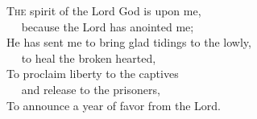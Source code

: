 
\lettrine{T}{he} spirit of the Lord God is upon me,\\
   because the Lord has anointed me;\\
He has sent me to bring glad tidings to the lowly,\\
   to heal the broken hearted,\\
To proclaim liberty to the captives\\
   and release to the prisoners,\\
To announce a year of favor from the Lord.
